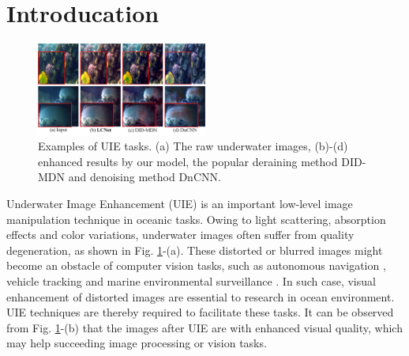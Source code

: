 \documentclass[journal]{IEEEtran}
\begin{document}
\section{Introducation}
\begin{figure}[ht]
\centering 
{   
\includegraphics[width=0.5\textwidth]{Figs/Fig1.jpg}

}     
\caption{Examples of UIE tasks. (a) The raw underwater images, (b)-(d) enhanced results by our model, the
popular deraining method DID-MDN and denoising method DnCNN.}
\label{Fig1}
\end{figure}
Underwater Image Enhancement (UIE) is an important low-level image manipulation technique in oceanic tasks. Owing to light scattering, absorption effects and color variations, underwater images often suffer from quality degeneration, as shown in Fig. \ref{Fig1}-(a). These distorted or blurred images might become an obstacle of computer vision tasks, such as autonomous navigation \cite{lee2012vision}, vehicle tracking \cite{liu2016fully} and marine environmental surveillance \cite{underwaterscene}. In such case, visual enhancement of distorted images are essential to research in ocean environment. UIE techniques are thereby required to facilitate these tasks. It can be observed from Fig. \ref{Fig1}-(b) that the images after UIE are with enhanced visual quality, which may help succeeding image processing or vision tasks. 
\end{document}
